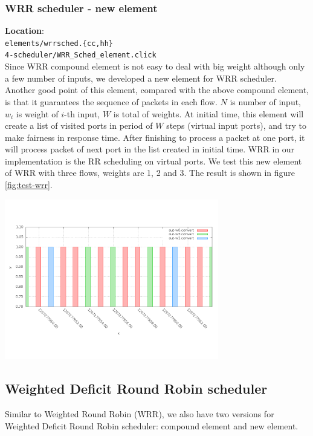 \documentclass[a4paper]{article}
\begin{document}
  \subsubsection{WRR scheduler - new element}
  \textbf{Location}: \\
  \texttt{elements/wrrsched.\{cc,hh\}} \\ 
  \texttt{4-scheduler/WRR\_Sched\_element.click}\\
  Since WRR compound element is not easy to deal with big weight although only a few number of inputs, we developed a new element for WRR scheduler. Another good point of this element, compared with the above compound element, is that it guarantees the sequence of packets in each flow. $N$ is number of input, $w_i$ is weight of $i$-th input, $W$ is total of weights. At initial time, this element will create a list of visited ports in period of $W$ steps (virtual input ports), and try to make fairness in response time. After finishing to process a packet at one port, it will process packet of next port in the list created in initial time. WRR in our implementation is the RR scheduling on virtual ports. We test this new element of WRR with three flows, weights are 1, 2 and 3. The result is shown in figure \ref{fig:test-wrr}.
  \begin{center}
	\includegraphics[width=0.70\textwidth]{wrr-dense.png}
	\label{fig:test-wrr}
  \end{center}

  \subsection{Weighted Deficit Round Robin scheduler}
  Similar to Weighted Round Robin (WRR), we also have two versions for Weighted Deficit Round Robin scheduler: compound element and new element.
\end{document}
